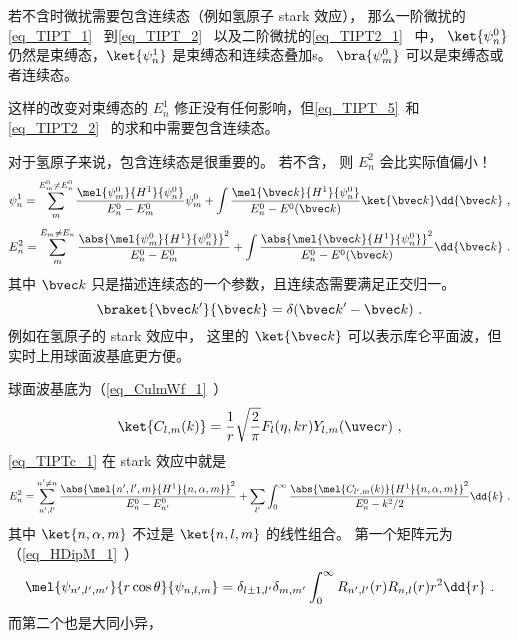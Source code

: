 
\begin{issues}
\issueDraft
\end{issues}


若不含时微扰需要包含连续态（例如氢原子 stark 效应）， 那么一阶微扰的\autoref{eq_TIPT_1}~ 到\autoref{eq_TIPT_2}~ 以及二阶微扰的\autoref{eq_TIPT2_1}~ 中， $\ket{\psi_n^0}$ 仍然是束缚态，$\ket{\psi_n^1}$ 是束缚态和连续态叠加s。 $\bra{\psi_m^0}$ 可以是束缚态或者连续态。

这样的改变对束缚态的 $E_n^1$ 修正没有任何影响，但\autoref{eq_TIPT_5}~和\autoref{eq_TIPT2_2}~ 的求和中需要包含连续态。

对于氢原子来说，包含连续态是很重要的。 若不含， 则 $E_n^2$ 会比实际值偏小！
\begin{equation}
\psi_n^1 = \sum_m^{E_m^0 \ne E_n^0} \frac{\mel{\psi_m^0}{H^1}{\psi_n^0}}{E_n^0 - E_m^0} \psi_m^0
+ \int \frac{\mel{\bvec k}{H^1}{\psi_n^0}}{E_n^0 - E^0(\bvec k)} \ket{\bvec k}\dd{\bvec k}~,
\end{equation}
%
\begin{equation}\label{eq_TIPTc_1}
E_n^2 = \sum_{m}^{E_m\ne E_n} \frac{\abs{\mel{\psi_m^0}{H^1}{\psi_n^0}}^2}{E_n^0-E_m^0}
+ \int \frac{\abs{\mel{\bvec k}{H^1}{\psi_n^0}}^2}{E_n^0-E^0(\bvec k)}\dd{\bvec k}~.
\end{equation}
其中 $\bvec k$ 只是描述连续态的一个参数，且连续态需要满足正交归一。
\begin{equation}
\braket{\bvec k'}{\bvec k} = \delta(\bvec k'-\bvec k)~.
\end{equation}
例如在氢原子的 stark 效应中， 这里的 $\ket{\bvec k}$ 可以表示库仑平面波，但实时上用球面波基底更方便。

球面波基底为（\autoref{eq_CulmWf_1}~）
\begin{equation}
\ket{C_{l,m}(k)} = \frac{1}{r} \sqrt{\frac{2}{\pi}} F_l(\eta, kr) Y_{l,m}(\uvec r)~,
\end{equation}
\autoref{eq_TIPTc_1} 在 stark 效应中就是
\begin{equation}
E_n^2 = \sum_{n',l'}^{n'\ne n} \frac{\abs{\mel{n',l',m}{H^1}{n,\alpha,m}}^2}{E_n^0-E_{n'}^0}
+ \sum_{l'}\int_0^\infty \frac{\abs{\mel{C_{l',m}(k)}{H^1}{n,\alpha,m}}^2}{E_n^0-k^2/2}\dd{k}~.
\end{equation}
其中 $\ket{n,\alpha,m}$ 不过是 $\ket{n,l,m}$ 的线性组合。 第一个矩阵元为（\autoref{eq_HDipM_1}~）
\begin{equation}
\mel{\psi_{n',l',m'}}{r\cos\theta}{\psi_{n,l,m}}\\
= \delta_{l\pm 1,l'}\delta_{m,m'}\int_0^\infty R_{n',l'}(r)R_{n,l}(r)r^2\dd{r}~.
\end{equation}
而第二个也是大同小异，
